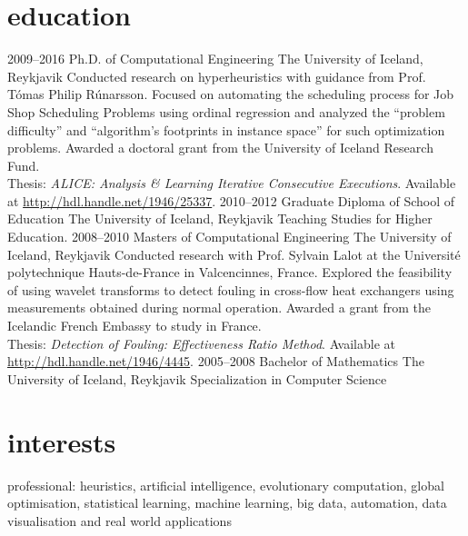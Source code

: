 \documentclass[]{cv} %
\begin{document}
\section{education}
\begin{entrylist}
\entry
{2009--2016}
{Ph.D. {\normalfont of Computational Engineering}}
{The University of Iceland, Reykjavik}
{Conducted research on hyperheuristics with guidance from Prof. Tómas Philip Rúnarsson. Focused on automating the scheduling process for Job Shop Scheduling Problems using ordinal regression and analyzed the ``problem difficulty'' and ``algorithm's footprints in instance space'' for such optimization problems. Awarded a doctoral grant from the University of Iceland Research Fund. \\
{\boldfont Thesis:} \emph{ALICE: Analysis \& Learning Iterative Consecutive Executions}. Available at \url{http://hdl.handle.net/1946/25337}.}
\entry
{2010--2012}
{Graduate Diploma {\normalfont of School of Education}}
{The University of Iceland, Reykjavik}
{Teaching Studies for Higher Education.}
\entry
{2008--2010}
{Masters {\normalfont of Computational Engineering}}
{The University of Iceland, Reykjavik}
{Conducted research with Prof. Sylvain Lalot at the Université polytechnique Hauts-de-France in Valcencinnes, France. Explored the feasibility of using wavelet transforms to detect fouling in cross-flow heat exchangers using measurements obtained during normal operation.
Awarded a grant from the Icelandic French Embassy to study in France. \\	
{\boldfont Thesis:} \emph{Detection of Fouling: Effectiveness Ratio Method}. Available at \url{http://hdl.handle.net/1946/4445}.}
\entry
{2005--2008}
{Bachelor {\normalfont of Mathematics}}
{The University of Iceland, Reykjavik}
{Specialization in Computer Science}
\end{entrylist}


\section{interests}
{\boldfont professional:} heuristics, artificial intelligence, evolutionary 
computation, global optimisation, statistical learning, machine learning, big data, automation, data visualisation and real world applications 
\end{document}

